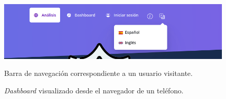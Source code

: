 \begin{figure}[h]
	\caption[Manual de usuario: barra navegación (visitante)]{Barra de navegación correspondiente a un usuario visitante.}
	\centering
	\includegraphics[width=\textwidth]{../img/anexos/user_guide/9_navbar_no_init}
	\label{e-9:navbar-2}
\end{figure}

\begin{figure}[h]
	\caption[Manual de usuario: \textit{dashboard} (versión móvil)]{\textit{Dashboard} visualizado desde el navegador de un teléfono.}
	\centering

\end{figure}

